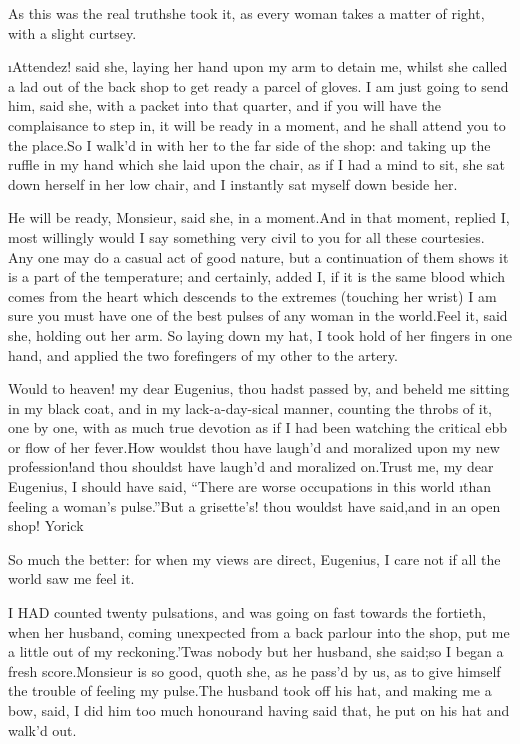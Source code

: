 \documentclass[twoside]{article}
\begin{document}
As this was the real truth\tsk she took it, as every woman takes a matter of
right, with a slight curtsey.

\tsk \i{Attendez}! said she, laying her hand upon my arm to detain me, whilst
she called a lad out of the back shop to get ready a parcel of gloves.  I
am just going to send him, said she, with a packet into that quarter, and
if you will have the complaisance to step in, it will be ready in a
moment, and he shall attend you to the place.\tsk So I walk’d in with her to
the far side of the shop: and taking up the ruffle in my hand which she
laid upon the chair, as if I had a mind to sit, she sat down herself in
her low chair, and I instantly sat myself down beside her.

\tsk He will be ready, Monsieur, said she, in a moment.\tsk And in that moment,
replied I, most willingly would I say something very civil to you for all
these courtesies.  Any one may do a casual act of good nature, but a
continuation of them shows it is a part of the temperature; and
certainly, added I, if it is the same blood which comes from the heart
which descends to the extremes (touching her wrist) I am sure you must
have one of the best pulses of any woman in the world.\tsk Feel it, said she,
holding out her arm.  So laying down my hat, I took hold of her fingers
in one hand, and applied the two forefingers of my other to the artery.\tsk 

\tsk Would to heaven! my dear Eugenius, thou hadst passed by, and beheld me
sitting in my black coat, and in my lack-a-day-sical manner, counting the
throbs of it, one by one, with as much true devotion as if I had been
watching the critical ebb or flow of her fever.\tsk How wouldst thou have
laugh’d and moralized upon my new profession!\tsk and thou shouldst have
laugh’d and moralized on.\tsk Trust me, my dear Eugenius, I should have said,
“There are worse occupations in this world \i{than feeling a woman’s
pulse}.”\tsk But a grisette’s! thou wouldst have said,\tsk and in an open shop!
Yorick\tsk 

\tsk So much the better: for when my views are direct, Eugenius, I care not
if all the world saw me feel it.






I HAD counted twenty pulsations, and was going on fast towards the
fortieth, when her husband, coming unexpected from a back parlour into
the shop, put me a little out of my reckoning.\tsk ’Twas nobody but her
husband, she said;\tsk so I began a fresh score.\tsk Monsieur is so good, quoth
she, as he pass’d by us, as to give himself the trouble of feeling my
pulse.\tsk The husband took off his hat, and making me a bow, said, I did him
too much honour\tsk and having said that, he put on his hat and walk’d out.
\end{document}
